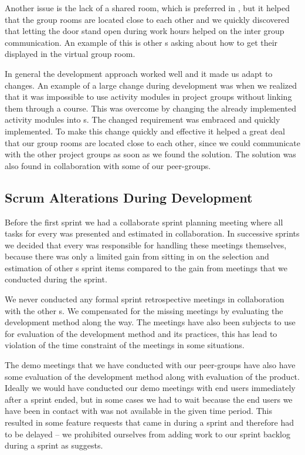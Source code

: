 Another issue is the lack of a shared room, which is preferred in \sos{}, but it helped that the group rooms are located close to each other and we quickly discovered that letting the door stand open during work hours helped on the inter group communication. 
An example of this is other \subgroup{}s asking about how to get their \block{} displayed in the virtual group room.

In general the development approach worked well and it made us adapt to changes. 
An example of a large change during development was when we realized that it was impossible to use activity modules in project groups without linking them through a course.
This was overcome by changing the already implemented activity modules into \block[]s. 
The changed requirement was embraced and quickly implemented.
To make this change quickly and effective it helped a great deal that our group rooms are located close to each other, since we could communicate with the other project groups as soon as we found the solution.
The solution was also found in collaboration with some of our peer-groups.

\subsection{Scrum Alterations During Development}
Before the first sprint we had a collaborate sprint planning meeting where all tasks for every \subgroup{} was presented and estimated in collaboration.
In successive sprints we decided that every \subgroup{} was responsible for handling these meetings themselves, because there was only a limited gain from sitting in on the selection and estimation of other \subgroup{}s sprint items compared to the gain from \sos{} meetings that we conducted during the sprint.

We never conducted any formal sprint retrospective meetings in collaboration with the other \subgroup{}s.
We compensated for the missing meetings by evaluating the development method along the way.
The \sos{} meetings have also been subjects to use for evaluation of the development method and its practices, this has lead to violation of the time constraint of the \sos{} meetings in some situations.

The demo meetings that we have conducted with our peer-groups have also have some evaluation of the development method along with evaluation of the product.
Ideally we would have conducted our demo meetings with end users immediately after a sprint ended, but in some cases we had to wait because the end users we have been in contact with was not available in the given time period.
This resulted in some feature requests that came in during a sprint and therefore had to be delayed -- we prohibited ourselves from adding work to our sprint backlog during a sprint as \scrum{} suggests.